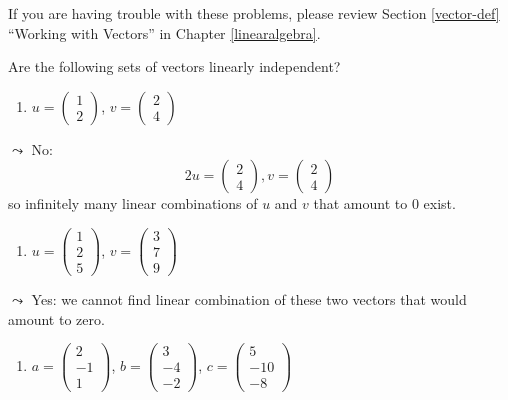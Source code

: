 \documentclass[
]{book}
\providecommand{\tightlist}{%
  \setlength{\itemsep}{0pt}\setlength{\parskip}{0pt}}
\theoremstyle{definition}
\theoremstyle{definition}
\theoremstyle{definition}
\theoremstyle{definition}
\theoremstyle{remark}
\begin{document}
If you are having trouble with these problems, please review Section \ref{vector-def} ``Working with Vectors'' in Chapter \ref{linearalgebra}.

Are the following sets of vectors linearly independent?

\begin{enumerate}
\def\labelenumi{\arabic{enumi}.}
\tightlist
\item
  \(u = \begin{pmatrix} 1\\ 2\end{pmatrix}\), \(v = \begin{pmatrix} 2\\4\end{pmatrix}\)
\end{enumerate}

\(\leadsto\) No: \[2u = \begin{pmatrix} 2\\ 4\end{pmatrix}, v = \begin{pmatrix} 2\\ 4\end{pmatrix}\]
so infinitely many linear combinations of \(u\) and \(v\) that amount to 0 exist.

\begin{enumerate}
\def\labelenumi{\arabic{enumi}.}
\setcounter{enumi}{1}
\tightlist
\item
  \(u = \begin{pmatrix} 1\\ 2\\ 5 \end{pmatrix}\), \(v = \begin{pmatrix} 3\\ 7\\ 9 \end{pmatrix}\)
\end{enumerate}

\(\leadsto\) Yes: we cannot find linear combination of these two vectors that would amount to zero.

\begin{enumerate}
\def\labelenumi{\arabic{enumi}.}
\setcounter{enumi}{2}
\tightlist
\item
  \(a = \begin{pmatrix} 2\\ -1\\ 1 \end{pmatrix}\), \(b = \begin{pmatrix} 3\\ -4\\ -2 \end{pmatrix}\), \(c = \begin{pmatrix} 5\\ -10\\ -8 \end{pmatrix}\)
\end{enumerate}
\end{document}
